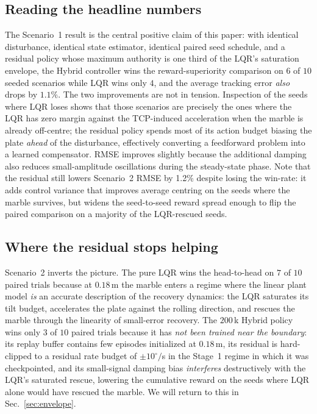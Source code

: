\documentclass[conference]{IEEEtran}
\begin{document}
\subsection{Reading the headline numbers}
The Scenario~1 result is the central positive claim of this paper: with
identical disturbance, identical state estimator, identical paired seed
schedule, and a residual policy whose maximum authority is one third of
the LQR's saturation envelope, the Hybrid controller wins the
reward-superiority comparison on $6$ of $10$ seeded scenarios while LQR
wins only $4$, and the average tracking error \emph{also} drops by
$1.1\%$. The two improvements are not in tension. Inspection of the
seeds where LQR loses shows that those scenarios are precisely the ones
where the LQR has zero margin against the TCP-induced acceleration when
the marble is already off-centre; the residual policy spends most of its
action budget biasing the plate \emph{ahead} of the disturbance,
effectively converting a feedforward problem into a learned compensator.
RMSE improves slightly because the additional damping also reduces
small-amplitude oscillations during the steady-state phase. Note that the residual still lowers Scenario~2 RMSE by 1.2\% despite losing the win-rate: it adds control variance that improves average centring on the seeds where the marble survives, but widens the seed-to-seed reward spread enough to flip the paired comparison on a majority of the LQR-rescued seeds.

\subsection{Where the residual stops helping}
Scenario~2 inverts the picture. The pure LQR wins the head-to-head on
$7$ of $10$ paired trials because at $0.18\,$m the marble enters a regime
where the linear plant model \emph{is} an accurate description of the
recovery dynamics: the LQR saturates its tilt budget, accelerates the
plate against the rolling direction, and rescues the marble through the
linearity of small-error recovery. The $200\,$k Hybrid policy wins only
$3$ of $10$ paired trials because it has \emph{not been trained near the
boundary}: its replay buffer contains few episodes initialized at
$0.18\,$m, its residual is hard-clipped to a residual rate budget of
$\pm 10^\circ/$s in the Stage~1 regime in which it was checkpointed, and
its small-signal damping bias \emph{interferes} destructively with the
LQR's saturated rescue, lowering the cumulative reward on the seeds
where LQR alone would have rescued the marble. We will return to this
in Sec.~\ref{sec:envelope}.
\end{document}
